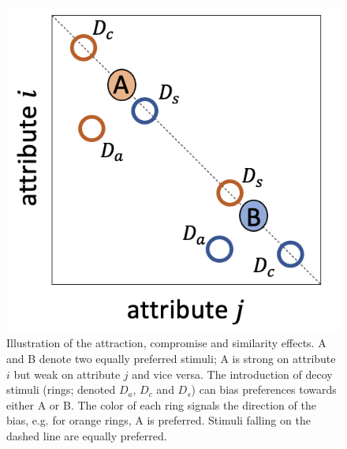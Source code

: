 \documentclass[a4paper, nobind]{templates/ociamthesis}
\begin{document}
\begin{figure}

{\centering \includegraphics[width=0.5\linewidth]{figures/decoy-illustr} 

}

\caption[Decoy effects]{Illustration of the attraction, compromise and similarity effects. A and B denote two equally preferred stimuli; A is strong on attribute $i$ but weak on attribute $j$ and vice versa. The introduction of decoy stimuli (rings; denoted $D_a$, $D_c$ and $D_s$) can bias preferences towards either A or B. The color of each ring signals the direction of the bias, e.g. for orange rings, A is preferred. Stimuli falling on the dashed line are equally preferred.}\label{fig:decoy-illustr}
\end{figure}
\end{document}
